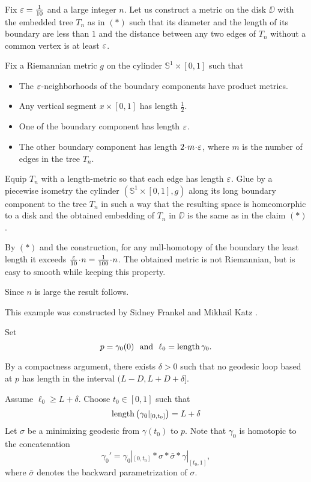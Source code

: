 Fix $\varepsilon=\tfrac1{10}$ and a large integer $n$.
Let us construct a metric on the disk $\DD$ with the embedded tree $T_n$ as in $({*})$ such that
its diameter and the length of its boundary are less than $1$
and  
the distance between any two edges of $T_n$ without a common vertex 
is at least $\varepsilon$.



Fix a Riemannian metric $g$ on the cylinder $\mathbb S^1\times [0,1]$ such that


\begin{itemize}
\item The $\varepsilon$-neighborhoods of the boundary components 
have product metrics.
\item Any vertical segment $x\times[0,1]$ has length $\tfrac 12$.
\item One of the boundary component has length $\varepsilon$.
\item The other boundary component has length $2\cdot m\cdot \eps$, 
where $m$ is the number of edges in the tree $T_n$.
\end{itemize}
Equip $T_n$ with a length-metric so that each edge has length $\varepsilon$.
Glue by a piecewise isometry the cylinder $(\mathbb S^1\times [0,1],g)$ along its long boundary component to the tree $T_n$  
in such a way that the resulting space is homeomorphic to a disk and the obtained embedding of $T_n$ in $\DD$ is the same as in the claim $({*})$.


By $({*})$ and the construction, for any null-homotopy of the boundary 
the least length it exceeds $\tfrac{\eps}{10}\cdot n=\tfrac{1}{100}\cdot n$.
The obtained metric is not Riemannian, but is easy to smooth while keeping this property.

Since $n$ is large the result follows.
\qeds
 
This example was constructed by Sidney Frankel and Mikhail Katz \cite[see][]{frankel-katz}.
 

Set 
\[p=\gamma_0(0)\ \ \text{and}\ \  \ell_0=\length\gamma_0.\]

By a compactness argument,
there exists $\delta>0$ 
such that no geodesic loop based at $p$ has length in the interval $(L-D, L+D+\delta]$. 

Assume $\ell_0\ge L+\delta$.
Choose $t_0\in [0,1]$ such that
\[\operatorname{\rm length}\left(\gamma_0|_{[0,t_0]}\right)=L+\delta\]
Let $\sigma$ be a minimizing geodesic from $\gamma(t_0)$
to $p$.
Note that $\gamma_0$ is homotopic to the concatenation 
\[\gamma_0'=\gamma_0|_{[0,t_0]}*\sigma*\bar\sigma*\gamma|_{[t_0,1]},\]
where $\bar\sigma$ denotes the backward parametrization of $\sigma$.


